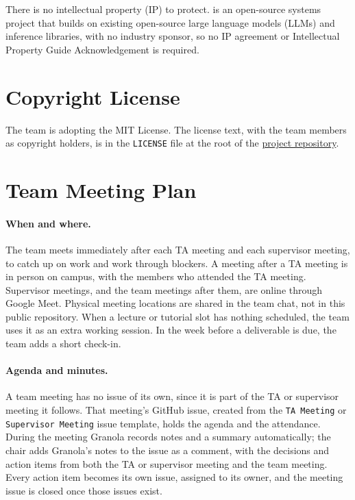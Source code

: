 \documentclass{article}
\begin{document}
There is no intellectual property (IP) to protect. \progname{} is an
open-source systems project that builds on existing open-source large
language models (LLMs) and inference libraries, with no industry sponsor, so no IP
agreement or
Intellectual Property Guide Acknowledgement is required.

\section{Copyright License}

The team is adopting the MIT License. The license text, with the team
members as copyright holders, is in the \texttt{LICENSE} file at the root
of the \href{https://github.com/jjustin-k/Tandem}{project repository}.

\section{Team Meeting Plan}

\paragraph{When and where.} The team meets immediately after each TA
meeting and each supervisor meeting, to catch up on work and work through
blockers. A meeting after a TA meeting is in person on campus, with the
members who attended the TA meeting. Supervisor meetings, and the team
meetings after them, are online through Google Meet. Physical meeting locations are shared in the team
chat, not in this public repository. When a lecture or tutorial slot has
nothing scheduled, the team uses it as an extra working session. In the
week before a deliverable is due, the team adds a short check-in.

\paragraph{Agenda and minutes.} A team meeting has no issue of its own,
since it is part of the TA or supervisor meeting it follows. That meeting's
GitHub issue, created from the \texttt{TA Meeting} or \texttt{Supervisor
Meeting} issue template, holds the agenda and the attendance. During the
meeting Granola records notes and a summary automatically; the chair adds
Granola's notes to the issue as a comment, with the decisions and action
items from both the TA or supervisor meeting and the team meeting. Every
action item becomes its own issue, assigned to its owner, and the meeting
issue is closed once those issues exist.
\end{document}
